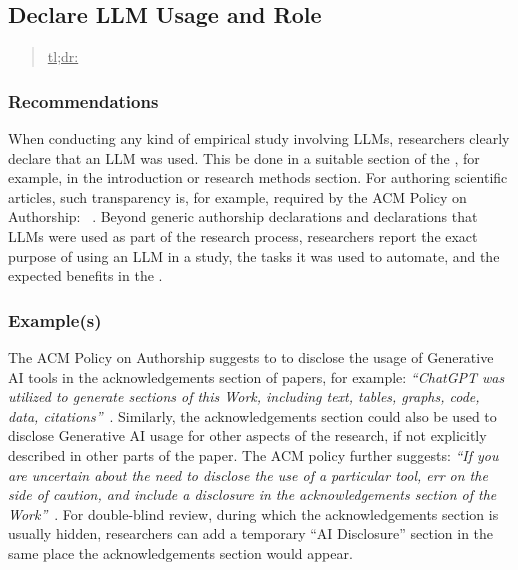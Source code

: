 



\subsection{Declare LLM Usage and Role}
\label{sec:declare-llm-usage-and-role}

\begin{quote}
\underline{tl;dr:}  
\end{quote}

\subsubsection{Recommendations}

When conducting any kind of empirical study involving LLMs, researchers \must clearly declare that an LLM was used.
This \should be done in a suitable section of the \paper, for example, in the introduction or research methods section.
For authoring scientific articles, such transparency is, for example, required by the ACM Policy on Authorship: ~\cite{ACM2023}.
Beyond generic authorship declarations and declarations that LLMs were used as part of the research process, researchers \should report the exact purpose of using an LLM in a study, the tasks it was used to automate, and the expected benefits in the \paper.


\subsubsection{Example(s)}

The ACM Policy on Authorship suggests to to disclose the usage of Generative AI tools in the acknowledgements section of papers, for example: \emph{``ChatGPT was utilized to generate sections of this Work, including text, tables, graphs, code, data, citations''}~\cite{ACM2023}. 
Similarly, the acknowledgements section could also be used to disclose Generative AI usage for other aspects of the research, if not explicitly described in other parts of the paper.
The ACM policy further suggests: \emph{``If you are uncertain ­about the need to disclose the use of a particular tool, err on the side of caution, and include a disclosure in the acknowledgements section of the Work''}~\cite{ACM2023}.
For double-blind review, during which the acknowledgements section is usually hidden, researchers can add a temporary ``AI Disclosure'' section in the same place the acknowledgements section would appear. 

